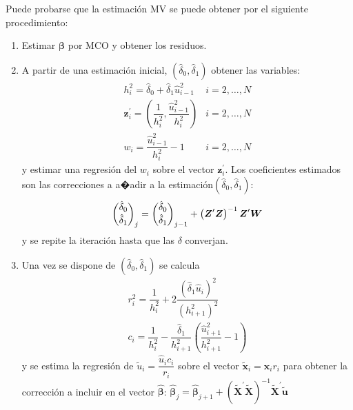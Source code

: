 Puede probarse que la estimaci\'on MV se puede obtener por el siguiente
procedimiento:
\begin{enumerate}
\item Estimar $\boldsymbol{\beta}$ por MCO y obtener los residuos.
\item A partir de una estimaci\'on inicial, $\left(\hat{\delta}_{0},\hat{\delta}_{1}\right)$
obtener las variables: 
\[
\begin{array}{cc}
h_{i}^{2}=\hat{\delta}_{0}+\hat{\delta}_{1}\hat{u}_{i-1}^{2} & i=2,\ldots,N\\
\boldsymbol{z}_{i}^{\prime}=\left(\dfrac{1}{h_{i}^{2}},\dfrac{\hat{u}_{i-1}^{2}}{h_{i}^{2}}\right) & i=2,\ldots,N\\
w_{i}=\dfrac{\hat{u}_{i-1}^{2}}{h_{i}^{2}}-1 & i=2,\ldots,N
\end{array}
\]
 y estimar una regresi\'on del $w_{i}$ sobre el vector $\boldsymbol{z}_{i}^{\prime}$.
Los coeficientes estimados son las correcciones a a�adir a la estimaci\'on$\left(\hat{\delta}_{0},\hat{\delta}_{1}\right)$:
\[
\dbinom{\hat{\delta}_{0}}{\hat{\delta}_{1}}_{j}=\dbinom{\hat{\delta}_{0}}{\hat{\delta}_{1}}_{j-1}+\left(\boldsymbol{Z}^{\prime}\boldsymbol{Z}\right)^{-1}\boldsymbol{Z}^{\prime}\boldsymbol{W}
\]
y se repite la iteraci\'on hasta que las $\delta$ converjan.
\item Una vez se dispone de $\left(\hat{\delta}_{0},\hat{\delta}_{1}\right)$
se calcula 
\[
\begin{array}{c}
r_{i}^{2}=\dfrac{1}{h_{i}^{2}}+2\dfrac{\left(\hat{\delta}_{1}\hat{u}_{i}\right)^{2}}{\left(h_{i+1}^{2}\right)^{2}}\\
c_{i}=\dfrac{1}{h_{i}^{2}}-\dfrac{\hat{\delta}_{1}}{h_{i+1}^{2}}\left(\dfrac{\hat{u}_{i+1}^{2}}{h_{i+1}^{2}}-1\right)
\end{array}
\]
 y se estima la regresi\'on de $\tilde{u}_{i}=\dfrac{\hat{u}_{i}c_{i}}{r_{i}}$
sobre el vector $\tilde{\boldsymbol{x}}_{i}=\boldsymbol{x}_{i}r_{i}$
para obtener la correcci\'on a incluir en el vector $\hat{\boldsymbol{\beta}}$:
$\hat{\boldsymbol{\beta}}_{j}=\hat{\boldsymbol{\beta}}_{j+1}+\left(\tilde{\boldsymbol{X}}^{\prime}\tilde{\boldsymbol{X}}\right)^{-1}\tilde{\boldsymbol{X}}^{\prime}\tilde{\boldsymbol{u}}$\end{enumerate}

